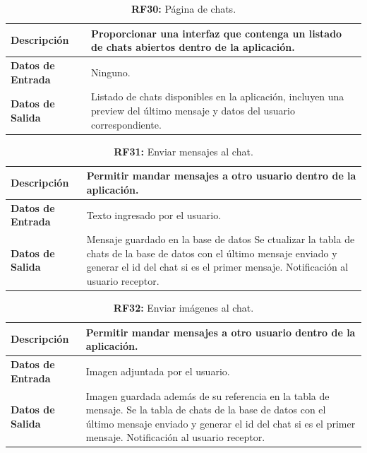 \documentclass[a4paper, 12pt]{article}
\begin{document}
\begin{table}[H]
\captionsetup{justification=raggedright,singlelinecheck=false}
\caption{\textbf{RF30:} Página de chats.}
\label{tab:RF30}
	\begin{tabular}{|m{5cm}|m{10cm}|}
	\hline
	\textbf{Descripción} & Proporcionar una interfaz que contenga un listado de chats abiertos dentro de la aplicación. \\ 
	\hline
	\textbf{Datos de Entrada} & Ninguno. \\ 
	\hline
	\textbf{Datos de Salida} & Listado de chats disponibles en la aplicación, incluyen una preview del último mensaje y datos del usuario correspondiente. \\ 
	\hline
\end{tabular}
\end{table}


\begin{table}[H]
\captionsetup{justification=raggedright,singlelinecheck=false}
\caption{\textbf{RF31:} Enviar mensajes al chat.}
\label{tab:RF31}
	\begin{tabular}{|m{5cm}|m{10cm}|}
	\hline
	\textbf{Descripción} & Permitir mandar mensajes a otro usuario dentro de la aplicación. \\ 
	\hline
	\textbf{Datos de Entrada} & Texto ingresado por el usuario. \\ 
	\hline
	\textbf{Datos de Salida} & Mensaje guardado en la base de datos Se ctualizar la tabla de chats de la base de datos con el último mensaje enviado y generar el id del chat si es el primer mensaje. Notificación al usuario receptor. \\ 
	\hline
\end{tabular}
\end{table}


\begin{table}[H]
\captionsetup{justification=raggedright,singlelinecheck=false}
\caption{\textbf{RF32:} Enviar imágenes al chat.}
\label{tab:RF32}
	\begin{tabular}{|m{5cm}|m{10cm}|}
\hline
	\textbf{Descripción} & Permitir mandar mensajes a otro usuario dentro de la aplicación. \\ 
	\hline
	\textbf{Datos de Entrada} & Imagen adjuntada por el usuario. \\ 
	\hline
	\textbf{Datos de Salida} & Imagen guardada además de su referencia en la tabla de mensaje. Se la tabla de chats de la base de datos con el último mensaje enviado y generar el id del chat si es el primer mensaje. Notificación al usuario receptor. \\ 
	\hline
\end{tabular}
\end{table}
\end{document}
